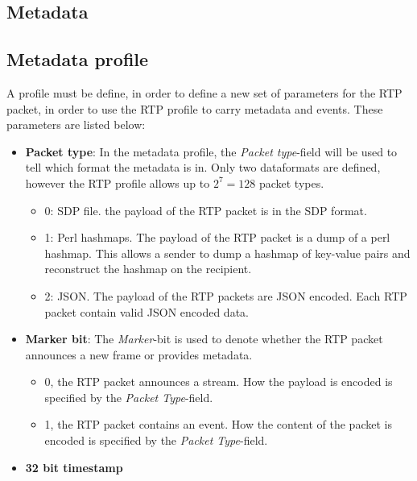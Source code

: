 \subsection{Metadata} \label{sec:design:metadata}

\subsection{Metadata profile} \label{sec:design:metadataprofile} 
A profile must be define, in order to define a new set of parameters for the RTP packet, in order to use the RTP profile to carry metadata and events. These parameters are listed below:

\begin{itemize}
	\item \textbf{Packet type}: In the metadata profile, the \textit{Packet type}-field will be used to tell which format the metadata is in. Only two  dataformats are defined, however the RTP profile allows up to $2^7=128$  packet types.
		\begin{itemize}
			\item 0: SDP file. the payload of the RTP packet is in the SDP format.
			\item 1: Perl hashmaps. The payload of the RTP packet is a dump of a perl hashmap. This allows a sender to dump a hashmap of key-value pairs and reconstruct the hashmap on the recipient.
			\item 2: JSON. The payload of the RTP packets are JSON encoded. Each RTP packet contain valid JSON encoded data.
		\end{itemize}
	\item \textbf{Marker bit}: The \textit{Marker}-bit is used to denote whether the RTP packet announces a new frame or provides metadata.
		\begin{itemize}
			\item 0, the RTP packet announces a stream. How the payload is encoded is specified by the \textit{Packet Type}-field.
			\item 1, the RTP packet contains an event. How the content of the packet is encoded is specified by the \textit{Packet Type}-field.
		\end{itemize}
	\item \textbf{32 bit timestamp}
\end{itemize}

